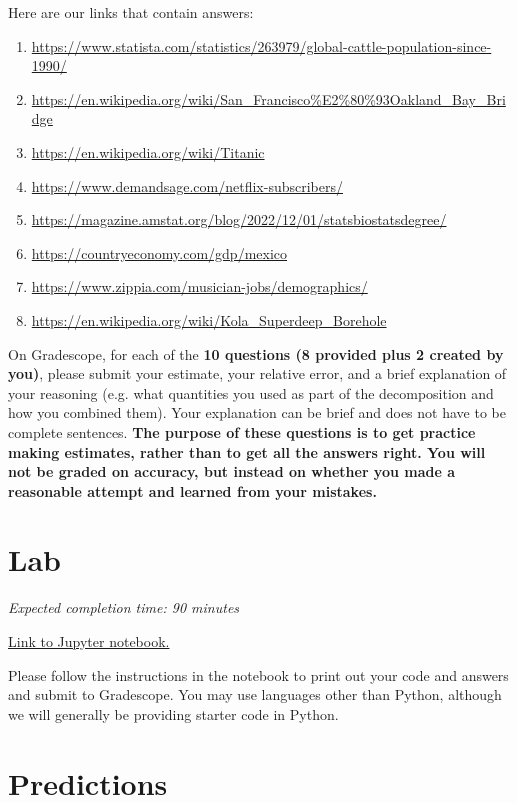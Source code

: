 \documentclass[11pt]{article}
\begin{document}
Here are our links that contain answers:
\begin{enumerate}
\item \url{https://www.statista.com/statistics/263979/global-cattle-population-since-1990/}
\item \url{https://en.wikipedia.org/wiki/San_Francisco%E2%80%93Oakland_Bay_Bridge}
\item \url{https://en.wikipedia.org/wiki/Titanic}
\item \url{https://www.demandsage.com/netflix-subscribers/}
\item \url{https://magazine.amstat.org/blog/2022/12/01/statsbiostatsdegree/}
\item \url{https://countryeconomy.com/gdp/mexico}
\item \url{https://www.zippia.com/musician-jobs/demographics/}
\item \url{https://en.wikipedia.org/wiki/Kola_Superdeep_Borehole}
\end{enumerate}


On Gradescope, for each of the \textbf{10 questions (8 provided plus 2 created by you)}, please submit your estimate, your relative error, and a brief explanation of your reasoning (e.g. what quantities you used as part of the decomposition and how you combined them). Your explanation can be brief and does not have to be complete sentences. \textbf{The purpose of these questions is to get practice making estimates, rather than to get all the answers right. You will not be graded on accuracy, but instead on whether you made a reasonable attempt and learned from your mistakes.}

\section*{Lab}

\emph{Expected completion time: 90 minutes}

\href{https://datahub.berkeley.edu/hub/user-redirect/git-pull?repo=https%3A%2F%2Fgithub.com%2Frsha256%2Fforecasting-class-sp24&branch=main&urlpath=tree%2Fforecasting-class-sp24%2Fhw%2Fhw2%2Fhw2_lab.ipynb}{Link to Jupyter notebook.}

Please follow the instructions in the notebook to print out your code and answers and submit to Gradescope. You may use languages other than Python, although we will generally be providing starter code in Python.


\section*{Predictions}
\end{document}

